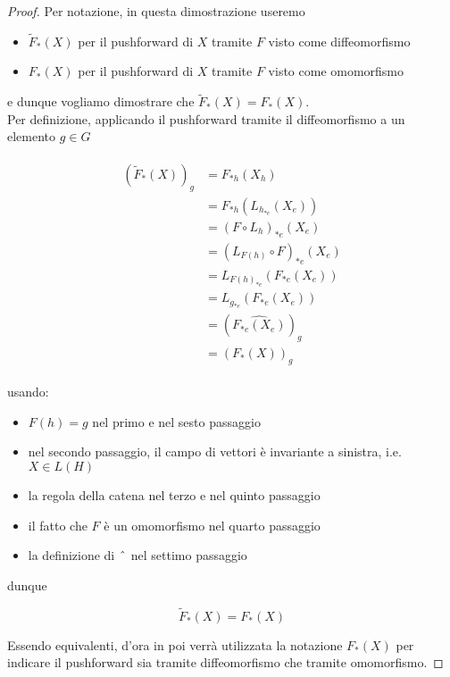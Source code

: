 \begin{proof}
	Per notazione, in questa dimostrazione useremo
	
	\begin{itemize}
		\item $ \tilde{F}_{*}(X) $ per il pushforward di $ X $ tramite $ F $ visto come diffeomorfismo
		
		\item $ F_{*}(X) $ per il pushforward di $ X $ tramite $ F $ visto come omomorfismo
	\end{itemize}

	e dunque vogliamo dimostrare che $ \tilde{F}_{*}(X) = F_{*}(X) $.\\
	Per definizione, applicando il pushforward tramite il diffeomorfismo a un elemento $ g \in G $
	
	\begin{align}
		\begin{split}
			(\tilde{F}_{*}(X))_{g} &= F_{*h}(X_{h})\\
			&= F_{*h}(L_{h_{*e}}(X_{e}))\\
			&= (F \circ L_{h})_{*e} (X_{e})\\
			&= (L_{F(h)} \circ F)_{*e} (X_{e})\\
			&= L_{F(h)_{*e}} (F_{*e}(X_{e}))\\
			&= L_{g_{*e}} (F_{*e}(X_{e}))\\
			&= (\widehat{ F_{*e}(X_{e}) })_{g}\\
			&= (F_{*}(X))_{g}
		\end{split}
	\end{align}

	usando:
	
	\begin{itemize}
		\item $ F(h) = g $ nel primo e nel sesto passaggio
		
		\item nel secondo passaggio, il campo di vettori è invariante a sinistra, i.e. $ X \in L(H) $
		
		\item la regola della catena nel terzo e nel quinto passaggio
		
		\item il fatto che $ F $ è un omomorfismo nel quarto passaggio
		
		\item la definizione di $ \; \hat{} \; $ nel settimo passaggio
	\end{itemize}

	dunque
	
	\begin{equation}
		\tilde{F}_{*}(X) = F_{*}(X)
	\end{equation}

	Essendo equivalenti, d'ora in poi verrà utilizzata la notazione $ F_{*}(X) $ per indicare il pushforward sia tramite diffeomorfismo che tramite omomorfismo.
\end{proof}

